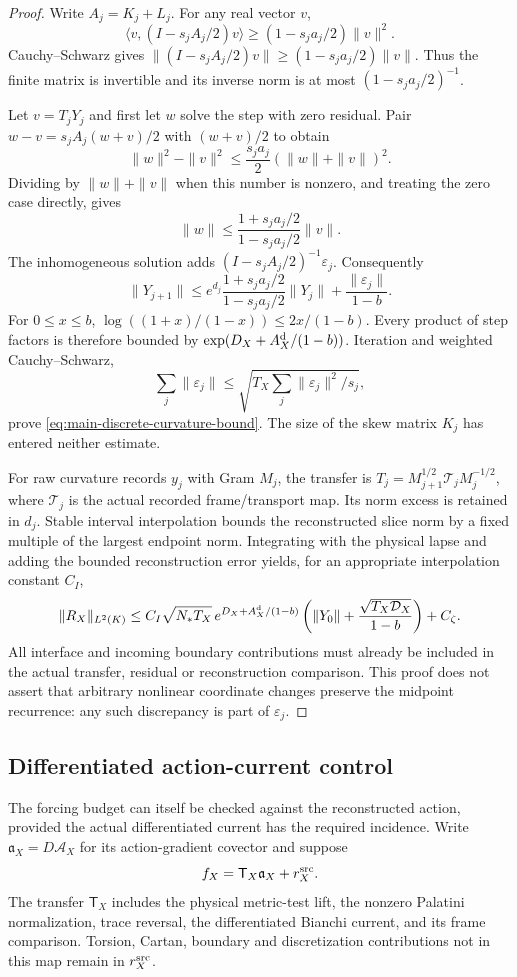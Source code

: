 \documentclass[11pt]{article}
\numberwithin{equation}{section}
\theoremstyle{definition}
\theoremstyle{remark}
\begin{document}
\begin{proof}
Write $A_j=K_j+L_j$.  For any real vector $v$,
\[
 \langle v,(I-s_jA_j/2)v\rangle
       \ge(1-s_ja_j/2)\|v\|^2.
\]
Cauchy--Schwarz gives
$\|(I-s_jA_j/2)v\|\ge(1-s_ja_j/2)\|v\|$.  Thus the finite matrix is
invertible and its inverse norm is at most $(1-s_ja_j/2)^{-1}$.

Let $v=T_jY_j$ and first let $w$ solve the step with zero residual.  Pair
$w-v=s_jA_j(w+v)/2$ with $(w+v)/2$ to obtain
\[
 \|w\|^2-\|v\|^2
 \le\frac{s_ja_j}{2}(\|w\|+\|v\|)^2.
\]
Dividing by $\|w\|+\|v\|$ when this number is nonzero, and treating the
zero case directly, gives
\[
 \|w\|\le\frac{1+s_ja_j/2}{1-s_ja_j/2}\|v\|.
\]
The inhomogeneous solution adds
$(I-s_jA_j/2)^{-1}\varepsilon_j$.  Consequently
\[
 \|Y_{j+1}\|\le e^{d_j}
       \frac{1+s_ja_j/2}{1-s_ja_j/2}\|Y_j\|
       +\frac{\|\varepsilon_j\|}{1-b}.
\]
For $0\le x\le b$,
$\log((1+x)/(1-x))\le2x/(1-b)$.  Every product of step factors is
therefore bounded by $\exp(D_X+A_X^{\rm d}/(1-b))$.
Iteration and weighted Cauchy--Schwarz,
\[
 \sum_j\|\varepsilon_j\|
       \le\sqrt{T_X\sum_j\|\varepsilon_j\|^2/s_j},
\]
prove \eqref{eq:main-discrete-curvature-bound}.  The size of the skew matrix
$K_j$ has entered neither estimate.

For raw curvature records $y_j$ with Gram $M_j$, the transfer is
$T_j=M_{j+1}^{1/2}\mathcal T_jM_j^{-1/2}$, where $\mathcal T_j$ is the
actual recorded frame/transport map.  Its norm excess is retained in $d_j$.
Stable interval interpolation bounds the reconstructed slice norm by a fixed
multiple of the largest endpoint norm.  Integrating with the physical lapse
and adding the bounded reconstruction error yields, for an appropriate
interpolation constant $C_I$,
\[
 \|R_X\|_{L^2(K)}
 \le C_I\sqrt{N_*T_X}\,e^{D_X+A_X^{\rm d}/(1-b)}
       \left(\|Y_0\|+\frac{\sqrt{T_X\mathcal D_X}}{1-b}\right)+C_\zeta.
\]
All interface and incoming boundary contributions must already be included
in the actual transfer, residual or reconstruction comparison.  This proof
does not assert that arbitrary nonlinear coordinate changes preserve the
midpoint recurrence: any such discrepancy is part of $\varepsilon_j$.
\end{proof}

\subsection{Differentiated action-current control}

The forcing budget can itself be checked against the reconstructed action,
provided the actual differentiated current has the required incidence.  Write
$\mathfrak a_X=D\mathcal A_X$ for its action-gradient covector and suppose
\begin{equation}
 f_X=\mathsf T_X\mathfrak a_X+r_X^{\rm src}.
 \label{eq:main-current-incidence}
\end{equation}
The transfer $\mathsf T_X$ includes the physical metric-test lift, the nonzero
Palatini normalization, trace reversal, the differentiated Bianchi current,
and its frame comparison.  Torsion, Cartan, boundary and discretization
contributions not in this map remain in $r_X^{\rm src}$.
\end{document}
